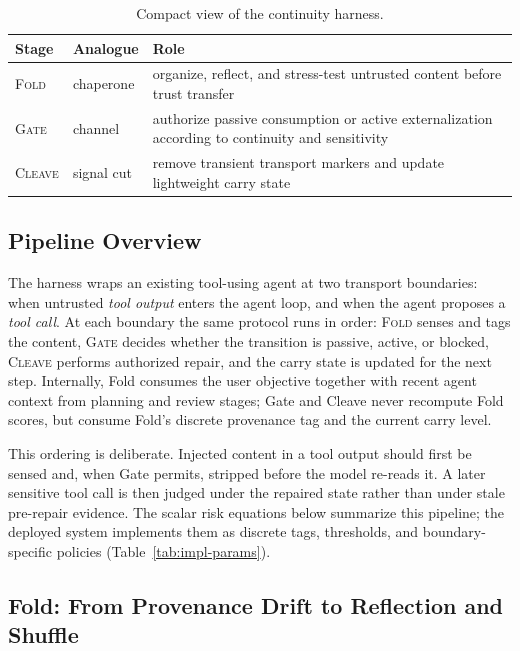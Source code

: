 \begin{table}[t]
\centering
\small
\setlength{\tabcolsep}{3pt}
\caption{Compact view of the continuity harness.}
\label{tab:compact-design}
\begin{tabular}{p{}p{}p{}}
\toprule
Stage & Analogue & Role \\
\midrule
\textsc{Fold} & chaperone & organize, reflect, and stress-test untrusted content before trust transfer \\
\textsc{Gate} & channel & authorize passive consumption or active externalization according to continuity and sensitivity \\
\textsc{Cleave} & signal cut & remove transient transport markers and update lightweight carry state \\
\bottomrule
\end{tabular}
\end{table}

\subsection{Pipeline Overview}

The harness wraps an existing tool-using agent at two transport boundaries: when untrusted \emph{tool output} enters the agent loop, and when the agent proposes a \emph{tool call}. At each boundary the same protocol runs in order: \textsc{Fold} senses and tags the content, \textsc{Gate} decides whether the transition is passive, active, or blocked, \textsc{Cleave} performs authorized repair, and the carry state is updated for the next step. Internally, Fold consumes the user objective together with recent agent context from planning and review stages; Gate and Cleave never recompute Fold scores, but consume Fold's discrete provenance tag and the current carry level.

This ordering is deliberate. Injected content in a tool output should first be sensed and, when Gate permits, stripped before the model re-reads it. A later sensitive tool call is then judged under the repaired state rather than under stale pre-repair evidence. The scalar risk equations below summarize this pipeline; the deployed system implements them as discrete tags, thresholds, and boundary-specific policies (Table~\ref{tab:impl-params}).

\subsection{Fold: From Provenance Drift to Reflection and Shuffle}

